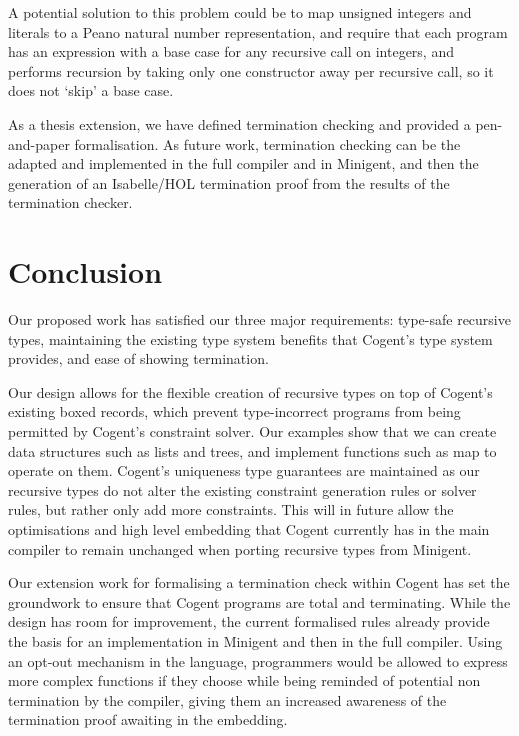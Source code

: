 A potential solution to this problem could be to map unsigned integers
and literals to a Peano natural number representation, and require that
each program has an expression with a base case for any recursive call
on integers, and performs recursion by taking only one constructor
away per recursive call, so it does not `skip' a base case.

As a thesis extension, we have defined termination checking and provided
a pen-and-paper formalisation. As future work, termination checking can be
the adapted and implemented in the full compiler and in Minigent, and then
the generation of an Isabelle/HOL termination proof from the results
of the termination checker.

\section{Conclusion}

Our proposed work has satisfied our three major requirements: type-safe recursive types,
maintaining the existing type system benefits that Cogent's type system provides,
and ease of showing termination.

Our design allows for the flexible creation of recursive types on top of Cogent's existing
boxed records, which prevent type-incorrect programs from being permitted by Cogent's
constraint solver. Our examples show that we can create data structures such as lists
and trees, and implement functions such as \textsf{map} to operate on them. Cogent's
uniqueness type guarantees are maintained as our recursive types do not alter the existing
constraint generation rules or solver rules, but rather only add more constraints.
This will in future allow the optimisations and high level embedding
that Cogent currently has in the main compiler to remain unchanged
when porting recursive types from Minigent.

Our extension work for formalising a termination check within Cogent has set the groundwork
to ensure that Cogent programs are total and terminating. While the design has room for
improvement, the current formalised rules already provide the basis for an implementation
in Minigent and then in the full compiler. Using an opt-out mechanism in the language,
programmers would be allowed to express more complex functions if they choose while being reminded
of potential non termination by the compiler, giving them an increased awareness
of the termination proof awaiting in the embedding.